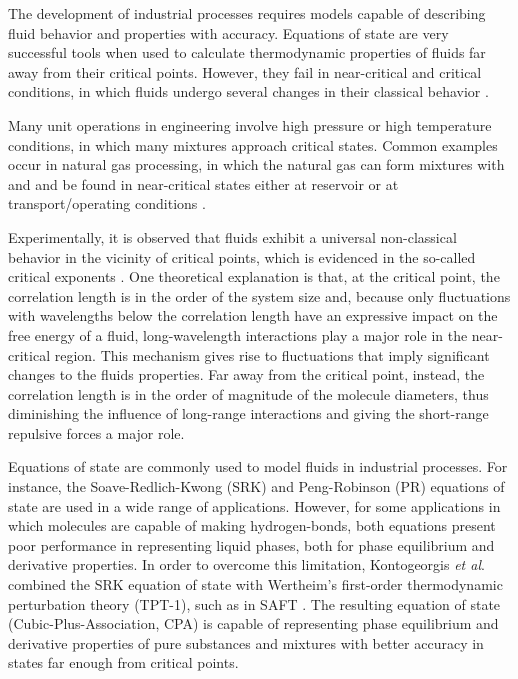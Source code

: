 \documentclass[preprint,12pt,3p]{elsarticle}
\begin{document}
The development of industrial processes requires models capable of describing fluid behavior and properties with accuracy.
Equations of state are very successful tools when used to calculate thermodynamic properties of fluids far away from their critical points.
However, they fail in near-critical and critical conditions, in which fluids undergo several changes in their classical behavior \cite{sengers1986thermodynamic}.

Many unit operations in engineering involve high pressure or high temperature conditions, in which many mixtures approach critical states.
Common examples occur in natural gas processing, in which the natural gas can form mixtures with  and  and be found in near-critical states either at reservoir or at transport/operating conditions  \citep{kermani2003carbon}.

Experimentally, it is observed that fluids exhibit a universal non-classical behavior in the vicinity of critical points, which is evidenced in the so-called critical exponents \citep{carles2010brief}.
One theoretical explanation is that, at the critical point, the correlation length is in the order of the system size and, because only fluctuations with wavelengths below the correlation length have an expressive impact on the free energy of a fluid, long-wavelength interactions play a major role in the near-critical region.
This mechanism gives rise to fluctuations that imply significant changes to the fluids properties.
Far away from the critical point, instead, the correlation length is in the order of magnitude of the molecule diameters, thus diminishing the influence of long-range interactions and giving the short-range repulsive forces a major role.

Equations of state are commonly used to model fluids in industrial processes.
For instance, the Soave-Redlich-Kwong (SRK) \cite{soave1972equilibrium} and Peng-Robinson (PR) \cite{peng1976new} equations of state are used in a wide range of applications.
However, for some applications in which molecules are capable of making hydrogen-bonds, both equations present poor performance in representing liquid phases, both for phase equilibrium and derivative properties.
In order to overcome this limitation, Kontogeorgis \textit{et al}. \cite{kontogeorgis1996equation} combined the SRK equation of state with Wertheim's first-order thermodynamic perturbation theory (TPT-1), such as in SAFT \citep{chapman1990new}.
The resulting equation of state (Cubic-Plus-Association, CPA) is capable of representing phase equilibrium and derivative properties of pure substances and mixtures with better accuracy in states far enough from critical points.
\end{document}
